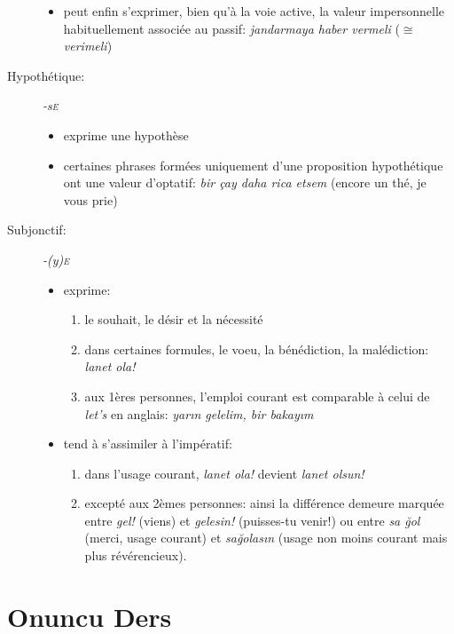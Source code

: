 \documentclass{cours}
\newcommand{\ug}{\u{g}}
\newcommand{\sce}{\textsc{e}}
\begin{document}
\begin{description}
\begin{itemize}
              \item peut enfin s'exprimer, bien qu'à la voie active, la valeur impersonnelle habituellement associée au passif: \textsl{jandarmaya haber vermeli} ($\cong$ \textsl{verimeli})
          \end{itemize}
    \item [Hypothétique:] \textsl{-s\sce}
          \begin{itemize}
              \item exprime une hypothèse
              \item certaines phrases formées uniquement d'une proposition hypothétique ont une valeur d'optatif: \textsl{bir çay daha rica etsem} (encore un thé, je vous prie)
          \end{itemize}
    \item [Subjonctif:] \textsl{-(y)\sce}
          \begin{itemize}
              \item exprime:
                    \begin{enumerate}
                        \item le souhait, le désir et la nécessité
                        \item dans certaines formules, le voeu, la bénédiction, la malédiction: \textsl{lanet ola!}
                        \item aux 1ères personnes, l'emploi courant est comparable à celui de \textsl{let's} en anglais: \textsl{yar\i n gelelim, bir bakay\i m}
                    \end{enumerate}
              \item tend à s'assimiler à l'impératif:
                    \begin{enumerate}
                        \item dans l'usage courant, \textsl{lanet ola!} devient \textsl{lanet olsun!}
                        \item excepté aux 2èmes personnes: ainsi la différence demeure marquée entre \textsl{gel!} (viens) et \textsl{gelesin!} (puisses-tu venir!) ou entre \textsl{sa \ug ol} (merci, usage courant) et \textsl{sa\ug olas\i n} (usage non moins courant mais plus révérencieux).
                    \end{enumerate}
          \end{itemize}
\end{description}

\section{Onuncu Ders}
\end{document}
